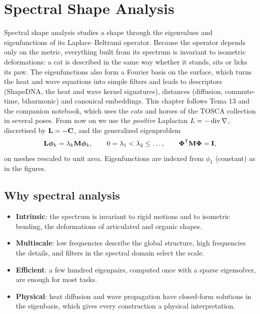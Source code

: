 \chapter{Spectral Shape Analysis}\label{ch:spectral}

Spectral shape analysis studies a shape through the eigenvalues and eigenfunctions of its
Laplace--Beltrami operator. Because the operator depends only on the metric, everything built from
its spectrum is invariant to isometric deformations: a cat is described in the same way whether it
stands, sits or licks its paw. The eigenfunctions also form a Fourier basis on the surface, which
turns the heat and wave equations into simple filters and leads to descriptors (ShapeDNA, the heat
and wave kernel signatures), distances (diffusion, commute-time, biharmonic) and canonical
embeddings. This chapter follows Tema 13 and the companion notebook, which uses the cats and horses
of the TOSCA collection in several poses. From now on we use the \emph{positive} Laplacian
$L=-\operatorname{div}\nabla$, discretised by $\mathbf{L}=-\mathbf{C}$, and the generalized eigenproblem
\begin{equation}
\mathbf{L}\boldsymbol{\phi}_k=\lambda_k\mathbf{M}\boldsymbol{\phi}_k,\qquad 0=\lambda_1<\lambda_2\le\dots,\qquad \boldsymbol{\Phi}^{\mathsf{T}}\mathbf{M}\boldsymbol{\Phi}=\mathbf{I} ,
\label{eq:spec}
\end{equation}
on meshes rescaled to unit area. Eigenfunctions are indexed from $\phi_1$ (constant) as in the
figures.

\section{Why spectral analysis}

\begin{itemize}
  \item \textbf{Intrinsic}: the spectrum is invariant to rigid motions and to isometric bending, the
  deformations of articulated and organic shapes.
  \item \textbf{Multiscale}: low frequencies describe the global structure, high frequencies the
  details, and filters in the spectral domain select the scale.
  \item \textbf{Efficient}: a few hundred eigenpairs, computed once with a sparse eigensolver, are
  enough for most tasks.
  \item \textbf{Physical}: heat diffusion and wave propagation have closed-form solutions in the
  eigenbasis, which gives every construction a physical interpretation.
\end{itemize}

